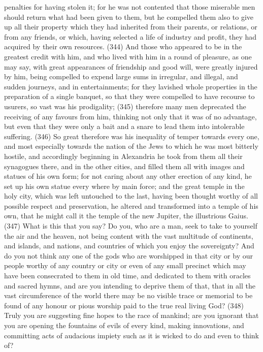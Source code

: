 penalties for having stolen it; for he was not contented that those miserable men should return what
had been given to them, but he compelled them also to give up all their property which they had
inherited from their parents, or relations, or from any friends, or which, having selected a life of
industry and profit, they had acquired by their own resources. (344) And those who appeared to be
in the greatest credit with him, and who lived with him in a round of pleasure, as one may say, with
great appearances of friendship and good will, were greatly injured by him, being compelled to
expend large sums in irregular, and illegal, and sudden journeys, and in entertainments; for they
lavished whole properties in the preparation of a single banquet, so that they were compelled to
have recourse to usurers, so vast was his prodigality; (345) therefore many men deprecated the
receiving of any favours from him, thinking not only that it was of no advantage, but even that they
were only a bait and a snare to lead them into intolerable suffering. (346) So great therefore was
his inequality of temper towards every one, and most especially towards the nation of the Jews to
which he was most bitterly hostile, and accordingly beginning in Alexandria he took from them all
their synagogues there, and in the other cities, and filled them all with images and statues of his
own form; for not caring about any other erection of any kind, he set up his own statue every where
by main force; and the great temple in the holy city, which was left untouched to the last, having
been thought worthy of all possible respect and preservation, he altered and transformed into a
temple of his own, that he might call it the temple of the new Jupiter, the illustrious Gaius. (347)
What is this that you say? Do you, who are a man, seek to take to yourself the air and the heaven,
not being content with the vast multitude of continents, and islands, and nations, and countries of
which you enjoy the sovereignty? And do you not think any one of the gods who are worshipped in
that city or by our people worthy of any country or city or even of any small precinct which may
have been consecrated to them in old time, and dedicated to them with oracles and sacred hymns,
and are you intending to deprive them of that, that in all the vast circumference of the world there
may be no visible trace or memorial to be found of any honour or pious worship paid to the true
real living God? (348) Truly you are suggesting fine hopes to the race of mankind; are you ignorant
that you are opening the fountains of evils of every kind, making innovations, and committing acts
of audacious impiety such as it is wicked to do and even to think of?

